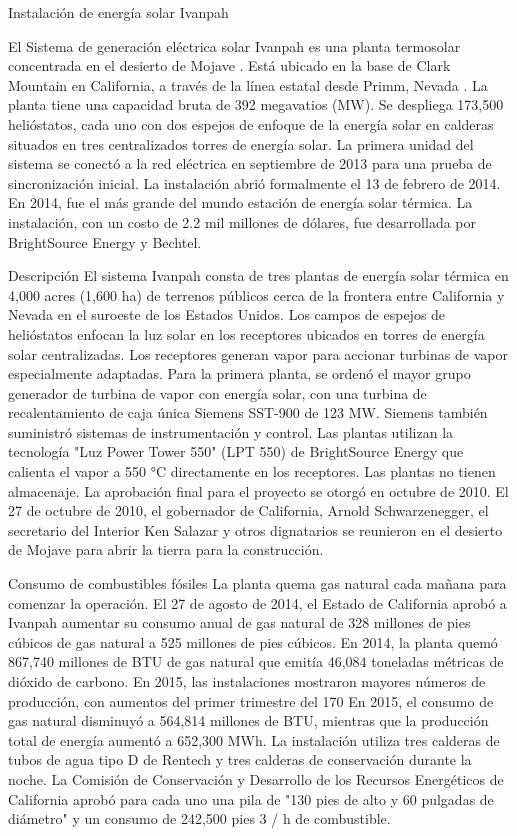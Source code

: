 \documentclass[12pt]{article}
\begin{document}
Instalación de energía solar Ivanpah

El Sistema de generación eléctrica solar Ivanpah es una planta termosolar concentrada en el desierto de Mojave . Está ubicado en la base de Clark Mountain en California, a través de la línea estatal desde Primm, Nevada . La planta tiene una capacidad bruta de 392 megavatios (MW). Se despliega 173,500 helióstatos, cada uno con dos espejos de enfoque de la energía solar en calderas situados en tres centralizados torres de energía solar. La primera unidad del sistema se conectó a la red eléctrica en septiembre de 2013 para una prueba de sincronización inicial. La instalación abrió formalmente el 13 de febrero de 2014. En 2014, fue el más grande del mundo estación de energía solar térmica.
La instalación, con un costo de 2.2 mil millones de dólares, fue desarrollada por BrightSource Energy y Bechtel.
 
Descripción
El sistema Ivanpah consta de tres plantas de energía solar térmica en 4,000 acres (1,600 ha) de terrenos públicos cerca de la frontera entre California y Nevada en el suroeste de los Estados Unidos.
Los campos de espejos de helióstatos enfocan la luz solar en los receptores ubicados en torres de energía solar centralizadas. Los receptores generan vapor para accionar turbinas de vapor especialmente adaptadas.
Para la primera planta, se ordenó el mayor grupo generador de turbina de vapor con energía solar, con una turbina de recalentamiento de caja única Siemens SST-900 de 123 MW. Siemens también suministró sistemas de instrumentación y control. Las plantas utilizan la tecnología "Luz Power Tower 550" (LPT 550) de BrightSource Energy que calienta el vapor a 550 °C directamente en los receptores. Las plantas no tienen almacenaje.
La aprobación final para el proyecto se otorgó en octubre de 2010. El 27 de octubre de 2010, el gobernador de California, Arnold Schwarzenegger, el secretario del Interior Ken Salazar y otros dignatarios se reunieron en el desierto de Mojave para abrir la tierra para la construcción.
 
Consumo de combustibles fósiles
La planta quema gas natural cada mañana para comenzar la operación. El 27 de agosto de 2014, el Estado de California aprobó a Ivanpah aumentar su consumo anual de gas natural de 328 millones de pies cúbicos de gas natural a 525 millones de pies cúbicos. En 2014, la planta quemó 867,740 millones de BTU de gas natural que emitía 46,084 toneladas métricas de dióxido de carbono. En 2015, las instalaciones mostraron mayores números de producción, con aumentos del primer trimestre del 170%
En 2015, el consumo de gas natural disminuyó a 564,814 millones de BTU, mientras que la producción total de energía aumentó a 652,300 MWh.
La instalación utiliza tres calderas de tubos de agua tipo D de Rentech y tres calderas de conservación durante la noche. La Comisión de Conservación y Desarrollo de los Recursos Energéticos de California aprobó para cada uno una pila de "130 pies de alto y 60 pulgadas de diámetro" y un consumo de 242,500 pies 3 / h de combustible.
 
\end{document}
